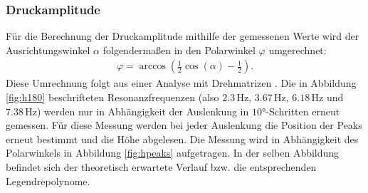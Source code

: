 \subsubsection{Druckamplitude}
Für die Berechnung der Druckamplitude mithilfe der gemessenen Werte wird der Ausrichtungswinkel $\alpha$ folgendermaßen in den Polarwinkel $\varphi$ umgerechnet:
\begin{align*}
  \varphi = \arccos(\frac{1}{2} \cos(\alpha) - \frac{1}{2}).
\end{align*}
Diese Umrechnung folgt aus einer Analyse mit Drehmatrizen \cite{qa-dresden}. Die in Abbildung \ref{fig:h180} beschrifteten Resonanzfrequenzen (also $2.3 \,\si{\hertz}$, $3.67 \,\si{\hertz}$, $6.18 \,\si{\hertz}$ und $7.38 \,\si{\hertz}$) werden nur in Abhängigkeit der Auslenkung in $10°$-Schritten erneut gemessen. Für diese Messung werden bei jeder Auslenkung die Position der Peaks erneut bestimmt und die Höhe abgelesen. 
Die Messung wird in Abhängigkeit des Polarwinkels in Abbildung \ref{fig:hpeaks} aufgetragen. In der selben Abbildung befindet sich der theoretisch erwartete Verlauf bzw. die entsprechenden Legendrepolynome. 
